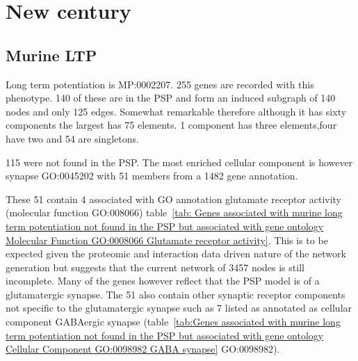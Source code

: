 \chapter{New century}

\section{Murine LTP}

Long term potentiation is MP:0002207. 255 genes are recorded with this phenotype. 140 of these are in the PSP and form an induced subgraph of 140 nodes and only 125 edges. Somewhat remarkable therefore although it has sixty components the largest has 75 elements. 1 component has three elements,four have two and 54 are singletons. 

115 were not found in the PSP. The most enriched cellular component is however synapse GO:0045202 with 51 members from a 1482 gene annotation. 

These 51 contain 4 associated with GO annotation glutamate receptor activity   (molecular function GO:008066) table~\ref{tab: Genes associated with murine long term potentiation not found in the PSP but associated with gene ontology Molecular Function GO:0008066 Glutamate receptor activity}. This is to be expected given the proteomic and interaction data driven nature of the network generation but suggests that the current network of 3457 nodes is still incomplete. Many of the genes however reflect that the PSP model is of a glutamatergic synapse. The 51 also contain other synaptic receptor components not specific to the glutamatergic synapse such as 7 listed as annotated as cellular component GABAergic synapse (table~\ref{tab:Genes associated with murine long term potentiation not found in the PSP but associated with gene ontology Cellular Component GO:0098982 GABA synapse} GO:0098982).


